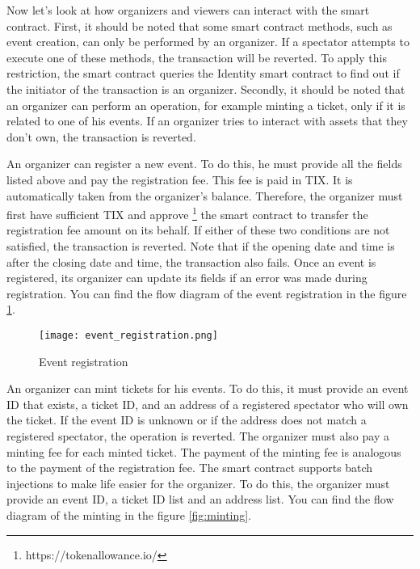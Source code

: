\documentclass[a4paper,11pt,oneside]{report}
\begin{document}
Now let's look at how organizers and viewers can interact with the smart contract. First, it should be noted that some smart contract methods, such as event creation, can only be performed by an organizer. If a spectator attempts to execute one of these methods, the transaction will be reverted. To apply this restriction, the smart contract queries the Identity smart contract to find out if the initiator of the transaction is an organizer. Secondly, it should be noted that an organizer can perform an operation, for example minting a ticket, only if it is related to one of his events. If an organizer tries to interact with assets that they don't own, the transaction is reverted.

An organizer can register a new event. To do this, he must provide all the fields listed above and pay the registration fee. This fee is paid in TIX. It is automatically taken from the organizer's balance. Therefore, the organizer must first have sufficient TIX and approve \footnote{https://tokenallowance.io/} the smart contract to transfer the registration fee amount on its behalf. If either of these two conditions are not satisfied, the transaction is reverted. Note that if the opening date and time is after the closing date and time, the transaction also fails. Once an event is registered, its organizer can update its fields if an error was made during registration. You can find the flow diagram of the event registration in the figure  \hyperref[fig:event_registration]{\ref{fig:event_registration}}.

\begin{figure}[h!]
  \texttt{[image: event\_registration.png]}
  \caption{Event registration}
  \label{fig:event_registration}
\end{figure}

An organizer can mint tickets for his events. To do this, it must provide an event ID that exists, a ticket ID, and an address of a registered spectator who will own the ticket. If the event ID is unknown or if the address does not match a registered spectator, the operation is reverted. The organizer must also pay a minting fee for each minted ticket. The payment of the minting fee is analogous to the payment of the registration fee. The smart contract supports batch injections to make life easier for the organizer. To do this, the organizer must provide an event ID, a ticket ID list and an address list. You can find the flow diagram of the minting in the figure  \hyperref[fig:minting]{\ref{fig:minting}}.
\end{document}
